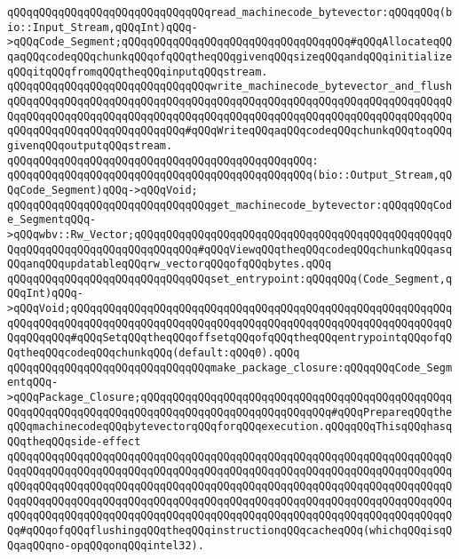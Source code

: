 \newline
\newline
\verb|qQQqqQQqqQQqqQQqqQQqqQQqqQQqqQQqread_machinecode_bytevector:qQQqqQQq(bio::Input_Stream,qQQqInt)qQQq->qQQqCode_Segment;qQQqqQQqqQQqqQQqqQQqqQQqqQQqqQQqqQQq#qQQqAllocateqQQqaqQQqcodeqQQqchunkqQQqofqQQqtheqQQqgivenqQQqsizeqQQqandqQQqinitializeqQQqitqQQqfromqQQqtheqQQqinputqQQqstream.|\newline
\newline
\verb|qQQqqQQqqQQqqQQqqQQqqQQqqQQqqQQqwrite_machinecode_bytevector_and_flushqQQqqQQqqQQqqQQqqQQqqQQqqQQqqQQqqQQqqQQqqQQqqQQqqQQqqQQqqQQqqQQqqQQqqQQqqQQqqQQqqQQqqQQqqQQqqQQqqQQqqQQqqQQqqQQqqQQqqQQqqQQqqQQqqQQqqQQqqQQqqQQqqQQqqQQqqQQqqQQqqQQqqQQq#qQQqWriteqQQqaqQQqcodeqQQqchunkqQQqtoqQQqgivenqQQqoutputqQQqstream.|\newline
\verb|qQQqqQQqqQQqqQQqqQQqqQQqqQQqqQQqqQQqqQQqqQQqqQQq:|\newline
\verb|qQQqqQQqqQQqqQQqqQQqqQQqqQQqqQQqqQQqqQQqqQQqqQQq(bio::Output_Stream,qQQqCode_Segment)qQQq->qQQqVoid;|\newline
\newline
\verb|qQQqqQQqqQQqqQQqqQQqqQQqqQQqqQQqget_machinecode_bytevector:qQQqqQQqCode_SegmentqQQq->qQQqwbv::Rw_Vector;qQQqqQQqqQQqqQQqqQQqqQQqqQQqqQQqqQQqqQQqqQQqqQQqqQQqqQQqqQQqqQQqqQQqqQQqqQQqqQQq#qQQqViewqQQqtheqQQqcodeqQQqchunkqQQqasqQQqanqQQqupdatableqQQqrw_vectorqQQqofqQQqbytes.qQQq|\newline
\newline
\verb|qQQqqQQqqQQqqQQqqQQqqQQqqQQqqQQqset_entrypoint:qQQqqQQq(Code_Segment,qQQqInt)qQQq->qQQqVoid;qQQqqQQqqQQqqQQqqQQqqQQqqQQqqQQqqQQqqQQqqQQqqQQqqQQqqQQqqQQqqQQqqQQqqQQqqQQqqQQqqQQqqQQqqQQqqQQqqQQqqQQqqQQqqQQqqQQqqQQqqQQqqQQqqQQqqQQqqQQq#qQQqSetqQQqtheqQQqoffsetqQQqofqQQqtheqQQqentrypointqQQqofqQQqtheqQQqcodeqQQqchunkqQQq(default:qQQq0).qQQq|\newline
\newline
\verb|qQQqqQQqqQQqqQQqqQQqqQQqqQQqqQQqmake_package_closure:qQQqqQQqCode_SegmentqQQq->qQQqPackage_Closure;qQQqqQQqqQQqqQQqqQQqqQQqqQQqqQQqqQQqqQQqqQQqqQQqqQQqqQQqqQQqqQQqqQQqqQQqqQQqqQQqqQQqqQQqqQQqqQQqqQQq#qQQqPrepareqQQqtheqQQqmachinecodeqQQqbytevectorqQQqforqQQqexecution.qQQqqQQqThisqQQqhasqQQqtheqQQqside-effect|\newline
\verb|qQQqqQQqqQQqqQQqqQQqqQQqqQQqqQQqqQQqqQQqqQQqqQQqqQQqqQQqqQQqqQQqqQQqqQQqqQQqqQQqqQQqqQQqqQQqqQQqqQQqqQQqqQQqqQQqqQQqqQQqqQQqqQQqqQQqqQQqqQQqqQQqqQQqqQQqqQQqqQQqqQQqqQQqqQQqqQQqqQQqqQQqqQQqqQQqqQQqqQQqqQQqqQQqqQQqqQQqqQQqqQQqqQQqqQQqqQQqqQQqqQQqqQQqqQQqqQQqqQQqqQQqqQQqqQQqqQQqqQQqqQQqqQQqqQQqqQQqqQQqqQQqqQQqqQQqqQQqqQQqqQQqqQQqqQQqqQQqqQQqqQQqqQQqqQQq#qQQqofqQQqflushingqQQqtheqQQqinstructionqQQqcacheqQQq(whichqQQqisqQQqaqQQqno-opqQQqonqQQqintel32).|\newline
